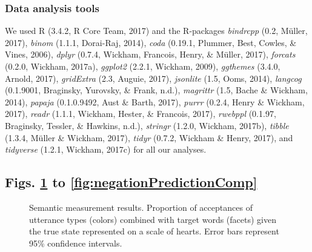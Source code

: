 \documentclass[12pt]{article}
\newcommand{\beginsupplement}{%
        \setcounter{table}{0}
        \renewcommand{\thetable}{S\arabic{table}}%
        \setcounter{figure}{0}
        \renewcommand{\thefigure}{S\arabic{figure}}%
     }
\begin{document}
\subsubsection*{Data analysis tools}

We used R (3.4.2, R Core Team, 2017) and the R-packages \emph{bindrcpp}
(0.2, Müller, 2017), \emph{binom} (1.1.1, Dorai-Raj, 2014), \emph{coda}
(0.19.1, Plummer, Best, Cowles, \& Vines, 2006), \emph{dplyr} (0.7.4,
Wickham, Francois, Henry, \& Müller, 2017), \emph{forcats} (0.2.0,
Wickham, 2017a), \emph{ggplot2} (2.2.1, Wickham, 2009), \emph{ggthemes}
(3.4.0, Arnold, 2017), \emph{gridExtra} (2.3, Auguie, 2017),
\emph{jsonlite} (1.5, Ooms, 2014), \emph{langcog} (0.1.9001, Braginsky,
Yurovsky, \& Frank, n.d.), \emph{magrittr} (1.5, Bache \& Wickham,
2014), \emph{papaja} (0.1.0.9492, Aust \& Barth, 2017), \emph{purrr}
(0.2.4, Henry \& Wickham, 2017), \emph{readr} (1.1.1, Wickham, Hester,
\& Francois, 2017), \emph{rwebppl} (0.1.97, Braginsky, Tessler, \&
Hawkins, n.d.), \emph{stringr} (1.2.0, Wickham, 2017b), \emph{tibble}
(1.3.4, Müller \& Wickham, 2017), \emph{tidyr} (0.7.2, Wickham \& Henry,
2017), and \emph{tidyverse} (1.2.1, Wickham, 2017c) for all our
analyses.


\subsection*{Figs. \ref{fig:litSem} to \ref{fig:negationPredictionComp}}

\setcounter{figure}{0}    
\beginsupplement

\begin{figure}[h]
\centering
\caption{\label{fig:litSem}Semantic measurement results. Proportion of
acceptances of utterance types (colors) combined with target words
(facets) given the true state represented on a scale of hearts. Error
bars represent 95\% confidence intervals.}
\end{figure}

\end{document}
